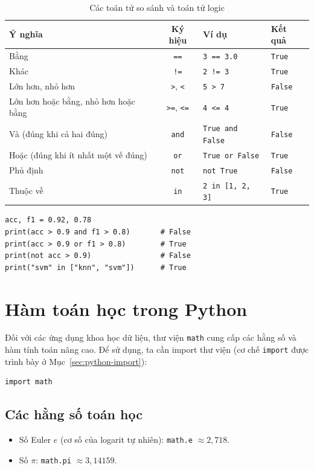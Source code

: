 \begin{table}[H]
\centering
\begin{tabular}{|l|c|l|l|}
\hline
\textbf{Ý nghĩa} & \textbf{Ký hiệu} & \textbf{Ví dụ} & \textbf{Kết quả} \\
\hline
Bằng & \texttt{==} & \texttt{3 == 3.0} & \texttt{True} \\
\hline
Khác & \texttt{!=} & \texttt{2 != 3} & \texttt{True} \\
\hline
Lớn hơn, nhỏ hơn & \texttt{>}, \texttt{<} & \texttt{5 > 7} & \texttt{False} \\
\hline
Lớn hơn hoặc bằng, nhỏ hơn hoặc bằng & \texttt{>=}, \texttt{<=} & \texttt{4 <= 4} & \texttt{True} \\
\hline
Và (đúng khi cả hai đúng) & \texttt{and} & \texttt{True and False} & \texttt{False} \\
\hline
Hoặc (đúng khi ít nhất một vế đúng) & \texttt{or} & \texttt{True or False} & \texttt{True} \\
\hline
Phủ định & \texttt{not} & \texttt{not True} & \texttt{False} \\
\hline
Thuộc về & \texttt{in} & \texttt{2 in [1, 2, 3]} & \texttt{True} \\
\hline
\end{tabular}
\caption{Các toán tử so sánh và toán tử logic}
\end{table}

\begin{lstlisting}[caption={Kết hợp điều kiện bằng toán tử logic}]
acc, f1 = 0.92, 0.78
print(acc > 0.9 and f1 > 0.8)       # False
print(acc > 0.9 or f1 > 0.8)        # True
print(not acc > 0.9)                # False
print("svm" in ["knn", "svm"])      # True
\end{lstlisting}

\section{Hàm toán học trong Python}

Đối với các ứng dụng khoa học dữ liệu, thư viện \texttt{math} cung cấp các hằng số và hàm tính toán nâng cao. Để sử dụng, ta cần import thư viện (cơ chế \texttt{import} được trình bày ở Mục~\ref{sec:python-import}):

\begin{lstlisting}[caption={Import thư viện math}]
import math
\end{lstlisting}

\subsection{Các hằng số toán học}
\begin{itemize}
    \item Số Euler $e$ (cơ số của logarit tự nhiên): \texttt{math.e} $\approx 2{,}718$.
    \item Số $\pi$: \texttt{math.pi} $\approx 3{,}14159$.
\end{itemize}

